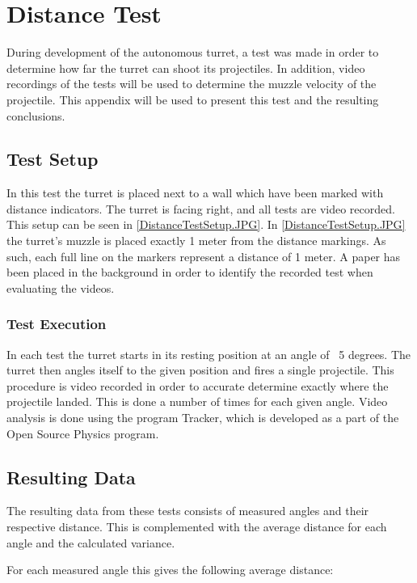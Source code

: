 \chapter{Distance Test}\label{AppendixDistTest}
During development of the autonomous turret, a test was made in order to
determine how far the turret can shoot its projectiles. In addition, video
recordings of the tests will be used to determine the muzzle velocity of the
projectile. This appendix will be used to present this test and the resulting
conclusions.

\section{Test Setup}
In this test the turret is placed next to a wall which have been marked with
distance indicators. The turret is facing right, and all tests are video
recorded. This setup can be seen in \autoref{DistanceTestSetup.JPG}.
 In \autoref{DistanceTestSetup.JPG} the turret's muzzle is placed exactly 1 meter
from the distance markings. As such, each full line on the markers represent a
distance of 1 meter. A paper has been placed in the background in order to
identify the recorded test when evaluating the videos. 

\subsection{Test Execution}
In each test the turret starts in its resting position at an angle of ~5
degrees. The turret then angles itself to the given position and fires a single
projectile. This procedure is video recorded in order to accurate determine
exactly where the projectile landed. This is done a number of times for each
given angle. Video analysis is done using the program Tracker, which is
developed as a part of the Open Source Physics program.

\section{Resulting Data}
The resulting data from these tests consists of measured angles and their
respective distance. This is complemented with the average distance for each
angle and the calculated variance.

For each measured angle this gives the following average distance:

